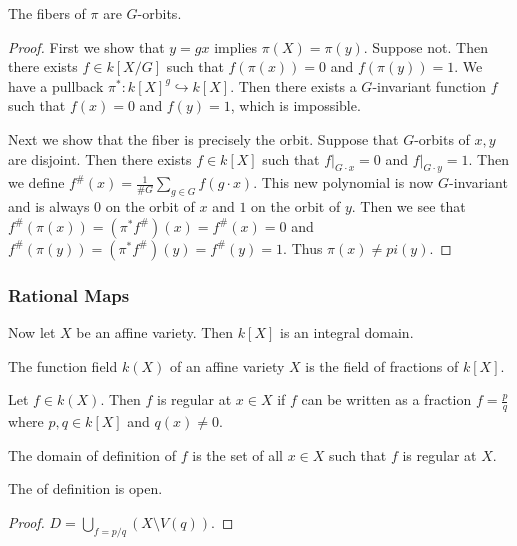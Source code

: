 \documentclass[twoside, 10pt]{article}
\begin{document}
    \begin{prop}
        The fibers of $\pi$ are $G$-orbits.
        \begin{proof}
            First we show that $y = gx$ implies $\pi(X) = \pi(y)$. Suppose not. Then there exists $f \in k[X/G]$ such that $f(\pi(x)) = 0$ and $f(\pi(y)) = 1$. We have a pullback $\pi^*: k[X]^g \hookrightarrow k[X]$. Then there exists a $G$-invariant function $f$ such that $f(x) = 0$ and $f(y) = 1$, which is impossible.

            Next we show that the fiber is precisely the orbit. Suppose that $G$-orbits of $x,y$ are disjoint. Then there exists $f \in k[X]$ such that $f \vert_{G \cdot x} = 0$ and $f \vert_{G \cdot y} = 1$. Then we define $f^\#(x) = \frac{1}{\#G} \sum_{g \in G} f(g \cdot x)$. This new polynomial is now $G$-invariant and is always $0$ on the orbit of $x$ and $1$ on the orbit of $y$. Then we see that $f^{\#}(\pi(x)) = (\pi^*f^{\#})(x) = f^{\#}(x) = 0$ and $f^{\#}(\pi(y)) = (\pi^*f^{\#})(y) = f^{\#}(y) = 1$. Thus $\pi(x) \neq pi(y)$.
        \end{proof}
    \end{prop}

    \subsubsection{Rational Maps}

    Now let $X$ be an affine variety. Then $k[X]$ is an integral domain.
    \begin{defn}
        The function field $k(X)$ of an affine variety $X$ is the field of fractions of $k[X]$.
    \end{defn}

    \begin{defn}
        Let $f \in k(X)$. Then $f$ is regular at $x \in X$ if $f$ can be written as a fraction $f = \frac{p}{q}$ where $p,q \in k[X]$ and $q(x) \neq 0$.
    \end{defn}

    \begin{defn}
        The domain of definition of $f$ is the set of all $x \in X$ such that $f$ is regular at $X$.
    \end{defn}

    \begin{prop}
        The of definition is open.
        \begin{proof}
            $D = \bigcup_{f = p/q} (X\setminus V(q))$.
        \end{proof}
    \end{prop}
\end{document}
